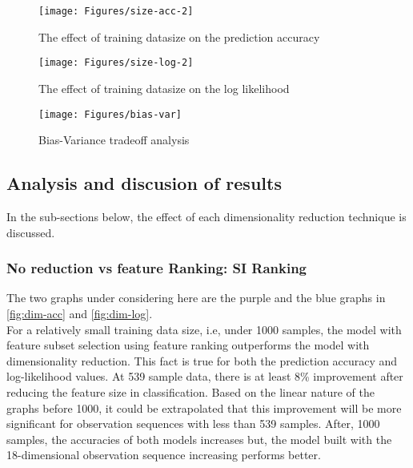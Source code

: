 \begin{figure}[ht!]
	\texttt{[image: Figures/size-acc-2]}
	\caption{The effect of training datasize on the prediction accuracy}
	\label{fig:size-acc}
\end{figure}

\begin{figure}[ht!]
	\texttt{[image: Figures/size-log-2]}
	\caption{The effect of training datasize on the log likelihood}
	\label{fig:size-log}
\end{figure}

\begin{figure}[ht!]
	\centering
	\texttt{[image: Figures/bias-var]}
	\caption{Bias-Variance tradeoff analysis}
	\label{fig:bias-var}
\end{figure}

\subsection{Analysis and discusion of results}
In the sub-sections below, the effect of each dimensionality reduction technique is discussed.

\subsubsection{No reduction vs feature Ranking: SI Ranking}
The two graphs under considering here are the purple and the blue graphs in \ref{fig:dim-acc} and \ref{fig:dim-log}. \\
For a relatively small training data size, i.e, under 1000 samples, the model with feature subset selection using feature ranking outperforms the model with dimensionality reduction. This fact is true for both the prediction accuracy and log-likelihood values. At 539 sample data, there is at least 8\% improvement after reducing the feature size in classification. Based on the linear nature of the graphs before 1000, it could be extrapolated that this improvement will be more significant for observation sequences with less than 539 samples.
After, 1000 samples, the accuracies of both models increases but, the model built with the 18-dimensional observation sequence increasing performs better.

